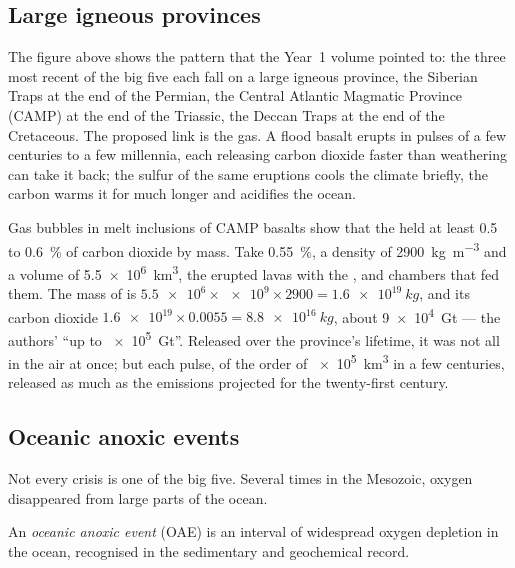 \subsection*{Large igneous provinces}

The figure above shows the pattern that the Year~1 volume pointed to: the three most recent of
the big five each fall on a large igneous province, the Siberian Traps at the end of the Permian,
the Central Atlantic Magmatic Province (CAMP) at the end of the Triassic, the Deccan Traps at the
end of the Cretaceous. The proposed link is the gas. A flood basalt erupts in pulses of a few
centuries to a few millennia, each releasing carbon dioxide faster than weathering can take it
back; the sulfur of the same eruptions cools the climate briefly, the carbon warms it for much
longer and acidifies the ocean.

\begin{example}\label{ex:b2:phanerozoic-earth:camp}
Gas bubbles in melt inclusions of CAMP basalts show that the  held at least 0.5 to
\qty{0.6}{\percent} of carbon dioxide by mass. Take \qty{0.55}{\percent}, a density of
\qty{2900}{kg.m^{-3}} and a volume of \qty{5.5e6}{km^3}, the erupted lavas with the , 
and chambers that fed them. The mass of  is $\num{5.5e6} \times \num{e9} \times 2900 =
\qty{1.6e19}{kg}$, and its carbon dioxide $\num{1.6e19} \times 0.0055 = \qty{8.8e16}{kg}$, about
\qty{9e4}{Gt} --- the authors' ``up to \qty{e5}{Gt}''. Released over the province's lifetime, it
was not all in the air at once; but each pulse, of the order of \qty{e5}{km^3} in a few
centuries, released as much as the emissions projected for the twenty-first century.
\end{example}

\subsection*{Oceanic anoxic events}

Not every crisis is one of the big five. Several times in the Mesozoic, oxygen disappeared from
large parts of the ocean.

\begin{definition}\label{def:b2:phanerozoic-earth:oae}
An \emph{oceanic anoxic event} (OAE) is an interval of widespread
oxygen depletion in the ocean, recognised in the sedimentary and geochemical record.
\end{definition}

